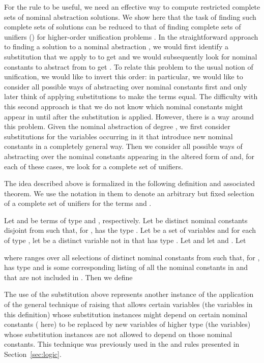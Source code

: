 For the  rule to be useful, we need an effective way
to compute restricted complete sets of nominal abstraction
solutions. We show here that the task of finding such complete sets of
solutions can be reduced to that of finding complete sets of unifiers
(\CSU) for higher-order unification problems \cite{huet75tcs}. In the
straightforward approach to finding a solution to a nominal
abstraction , we would first identify a substitution
 that we apply to  to get  and we
would subsequently look for nominal constants to abstract from  to
get .  To relate this problem to the usual notion of unification,
we would like to invert this order: in particular, we would like to
consider all possible ways of abstracting over nominal constants first
and only later think of applying substitutions to make the terms
equal. The difficulty with this second approach is that we do not know
which nominal constants might appear in  until after the
substitution is applied. However, there is a way around this
problem. Given the nominal abstraction  of degree , we
first consider substitutions for the variables occurring in it that
introduce  new nominal constants in a completely general way.  Then
we consider all possible ways of abstracting over the nominal
constants appearing in the altered form of  and, for each of these
cases, we look for a complete set of unifiers.

The idea described above is formalized in the following definition and
associated theorem. We use the notation  in them to denote
an arbitrary but fixed selection of a complete set of unifiers for
the terms  and .

\begin{definition}\label{def:s}
Let  and  be terms of type  and , respectively. Let  be 
distinct nominal constants disjoint from  such that,
for ,  has the type . Let  be a
set of variables and for each  of type , let
 be a distinct variable not in  that has type
. Let  and let  and . Let

where  ranges over all selections of 
distinct nominal constants from  such that,
for ,
 has type  and  is some corresponding listing of
all the nominal constants in  and  that are not included in
.
Then we define

\end{definition}

The use of the substitution  above represents
another instance of the application of the general technique of
raising that allows
certain variables (the  variables in this definition) whose
substitution instances might depend on certain nominal constants
( here) to be replaced by new variables of higher type
(the  variables) whose substitution instances are not allowed to
depend on those nominal constants. This technique was previously used
in the  and  rules presented in
Section~\ref{sec:logic}.

